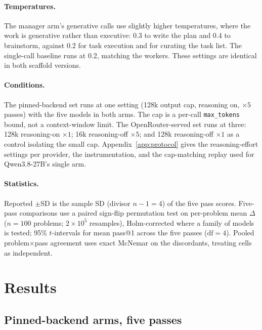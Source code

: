 \documentclass{article}
\begin{document}
\paragraph{Temperatures.} The manager arm's generative calls use slightly higher temperatures,
where the work is generative rather than executive: 0.3 to write the plan and 0.4 to brainstorm,
against 0.2 for task execution and for curating the task list. The single-call baseline runs at
0.2, matching the workers. These settings are identical in both scaffold versions.

\paragraph{Conditions.} The pinned-backend set runs at one setting (128k output cap,
reasoning on, $\times 5$ passes) with the five models in both arms. The cap is
a per-call \texttt{max\_tokens} bound, not a context-window limit. The OpenRouter-served set
runs at three: 128k reasoning-on $\times 1$; 16k reasoning-off $\times 5$; and 128k
reasoning-off $\times 1$ as a control isolating the small cap. Appendix~\ref{app:protocol}
gives the reasoning-effort settings per provider, the instrumentation, and the cap-matching
replay used for Qwen3.8-27B's single arm.

\paragraph{Statistics.} Reported $\pm$SD is the sample SD (divisor $n-1 = 4$) of the five
pass scores. Five-pass comparisons use a paired sign-flip permutation test on per-problem
mean $\Delta$ ($n = 100$ problems; $2\times10^{5}$ resamples), Holm-corrected where a family
of models is tested; 95\% $t$-intervals for mean pass@1 across the five passes
($\mathrm{df} = 4$). Pooled problem$\times$pass agreement uses exact McNemar on the
discordants, treating cells as independent.

\section{Results}
\label{sec:results}

\subsection{Pinned-backend arms, five passes}
\label{sec:pinned}




\end{document}
